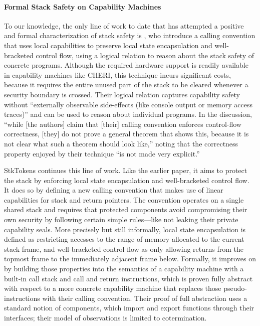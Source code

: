 \documentclass[acmsmall,review,anonymous]{acmart}\settopmatter{printfolios=true,printccs=false,printacmref=false}
\begin{document}

\paragraph{Formal Stack Safety on Capability Machines}
%
To our knowledge, the only line of work to date that has attempted
a positive and formal characterization of
stack safety is \citet{Skorstengaard+19b}, who introduce a calling
convention that uses local capabilities to preserve local state
encapsulation and well-bracketed control flow, using a logical
relation to reason about the stack safety of concrete
programs. Although the required hardware support is readily available
in capability machines like CHERI, this technique incurs significant
costs, because it requires the entire unused part of the stack to be
cleared whenever a security boundary is crossed. Their logical
relation captures capability safety without ``externally observable
side-effects (like console output or memory access traces)''
and can be used to reason about individual programs. In the
discussion, ``while [the authors] claim that [their] calling
convention enforces control-flow correctness, [they] do not prove a
general theorem that shows this, because it is not clear what such a
theorem should look like,'' noting that the correctness property
enjoyed by their technique ``is not made very explicit.''

StkTokens \citep{Skorstengaard+19} continues this line of work. Like
the earlier paper, it aims to protect the stack by enforcing local state
encapsulation and well-bracketed control flow. It does so by defining a new
calling convention that makes use of linear capabilities for stack and return
pointers. The convention operates on a single shared stack and requires that
protected components avoid compromising their own security by following certain
simple rules---like not leaking their private capability seals. More
precisely but still informally, local state encapsulation is defined as
restricting accesses to the range of memory allocated to the current stack
frame, and well-bracketed control flow as only allowing returns from the topmost
frame to the immediately adjacent frame below. Formally, it improves on
\citet{Skorstengaard+19b} by building those properties into the semantics of a
capability machine with a built-in call stack and call and return instructions,
which is proven fully abstract with respect to a more concrete capability
machine that replaces those pseudo-instructions with their calling convention.
Their proof of full abstraction uses a standard notion of components, which
import and export functions through their interfaces; their model of
observations is limited to cotermination.
\end{document}
